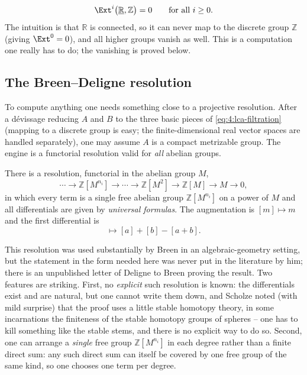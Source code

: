 \begin{example}
\label{ex:4:R-Z}
\begin{equation*}
\Ext^{i}\bigl(\underline{\mathbb{R}},\mathbb{Z}\bigr)=0\qquad\text{for all }i\geq0.
\end{equation*}
The intuition is that $\mathbb{R}$ is connected, so it can never map to the
discrete group $\mathbb{Z}$ (giving $\Ext^0=0$), and all higher groups vanish as
well. This is a computation one really has to do; the vanishing is proved below.
\end{example}

\subsection{The Breen--Deligne resolution}

To compute anything one needs something close to a projective resolution. After
a d\'evissage reducing $A$ and $B$ to the three basic pieces of
\eqref{eq:4:lca-filtration} (mapping to a discrete group is easy; the
finite-dimensional real vector spaces are handled separately), one may assume $A$
is a compact metrizable group. The engine is a functorial resolution valid for
\emph{all} abelian groups.

\begin{theorem}
\label{thm:4:breen-deligne}
There is a resolution, functorial in the abelian group $M$,
\begin{equation}
\label{eq:4:breen-deligne}
\cdots\to\mathbb{Z}[M^{n_i}]\to\cdots\to\mathbb{Z}[M^{2}]\to\mathbb{Z}[M]\to M\to0,
\end{equation}
in which every term is a single free abelian group $\mathbb{Z}[M^{n_i}]$ on a
power of $M$ and all differentials are given by \emph{universal formulas}. The
augmentation is $[m]\mapsto m$ and the first differential is
\begin{equation*}
[(a,b)]\longmapsto [a]+[b]-[a+b].
\end{equation*}
\end{theorem}

\begin{remark}
\label{rmk:4:breen-deligne-provenance}
This resolution was used substantially by Breen in an algebraic-geometry setting,
but the statement in the form needed here was never put in the literature by him;
there is an unpublished letter of Deligne to Breen proving the result. Two
features are striking. First, no \emph{explicit} such resolution is known: the
differentials exist and are natural, but one cannot write them down, and Scholze
noted (with mild surprise) that the proof uses a little stable homotopy theory,
in some incarnations the finiteness of the stable homotopy groups of spheres --
one has to kill something like the stable stems, and there is no explicit way to
do so. Second, one can arrange a \emph{single} free group $\mathbb{Z}[M^{n_i}]$
in each degree rather than a finite direct sum: any such direct sum can itself be
covered by one free group of the same kind, so one chooses one term per degree.
\end{remark}

